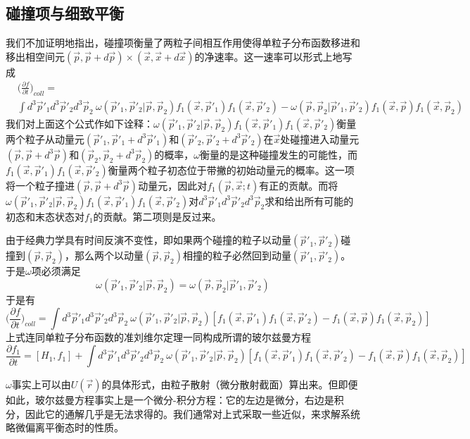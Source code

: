 \documentclass[a4paper,11pt]{ctexart}
\newcommand{\beq}{\begin{equation}}
\newcommand{\eeq}{\end{equation}}
\newcommand{\bea}{\begin{equation}\begin{aligned}}
\newcommand{\eea}{\end{aligned}\end{equation}}
\newcommand{\red}{\color{red}}
\newcommand{\pfrac}[2]{\frac{\partial #1}{\partial #2}}
\begin{document}
\subsection{碰撞项与细致平衡}
我们不加证明地指出，碰撞项衡量了两粒子间相互作用使得单粒子分布函数移进和移出相空间元$(\vec{p},\vec{p} + d\vec{p})\times (\vec{x},\vec{x}+d\vec{x})$的净速率。这一速率可以形式上地写成
\bea
&\bigg(\pfrac{f}{t}\bigg)_{coll} = \\ &\int d^3 \vec{p}'_1 d^3 \vec{p}'_2 d^3 \vec{p}_2 \ \omega(\vec{p}'_1,\vec{p}'_2|\vec{p},\vec{p}_2)f_1(\vec{x},\vec{p}'_1)f_1(\vec{x},\vec{p}'_2) - \omega(\vec{p},\vec{p}_2|\vec{p}'_1,\vec{p}'_2)f_1(\vec{x},\vec{p})f_1(\vec{x},\vec{p}_2)
\eea
我们对上面这个公式作如下诠释：$\omega(\vec{p}'_1,\vec{p}'_2|\vec{p},\vec{p}_2)f_1(\vec{x},\vec{p}'_1)f_1(\vec{x},\vec{p}'_2)$衡量两个粒子从动量元$(\vec{p}'_1,\vec{p}'_1 + d^3\vec{p}'_1)$和$(\vec{p}'_2,\vec{p}'_2 + d^3\vec{p}'_2)$在$\vec{x}$处碰撞进入动量元$(\vec{p},\vec{p} + d^3\vec{p})$和$(\vec{p}_2,\vec{p}_2 + d^3\vec{p}_2)$的概率，$\omega$衡量的是这种碰撞发生的可能性，而$f_1(\vec{x},\vec{p}'_1)f_1(\vec{x},\vec{p}'_2)$衡量两个粒子初态位于带撇的初始动量元的概率。这一项将一个粒子撞进$(\vec{p},\vec{p} + d^3\vec{p})$动量元，因此对$f_1(\vec{p},\vec{x};t)$有正的贡献。而将$\omega(\vec{p}'_1,\vec{p}'_2|\vec{p},\vec{p}_2)f_1(\vec{x},\vec{p}'_1)f_1(\vec{x},\vec{p}'_2)$对$d^3 \vec{p}'_1 d^3 \vec{p}'_2 d^3 \vec{p}_2$求和给出所有可能的初态和末态状态对$f_1$的贡献。第二项则是反过来。
\par
由于经典力学具有时间反演不变性，即如果两个碰撞的粒子以动量$(\vec{p}'_1,\vec{p}'_2)$碰撞到$(\vec{p},\vec{p}_2)$，那么两个以动量$(\vec{p},\vec{p}_2)$相撞的粒子必然回到动量$(\vec{p}'_1,\vec{p}'_2)$。于是$\omega$项必须满足
\beq
\omega(\vec{p}'_1,\vec{p}'_2|\vec{p},\vec{p}_2) = \omega(\vec{p},\vec{p}_2|\vec{p}'_1,\vec{p}'_2)
\eeq
于是有
\beq
\bigg(\pfrac{f}{t}\bigg)_{coll} = \int d^3 \vec{p}'_1 d^3 \vec{p}'_2 d^3 \vec{p}_2\ \omega(\vec{p}'_1,\vec{p}'_2|\vec{p},\vec{p}_2)[f_1(\vec{x},\vec{p}'_1)f_1(\vec{x},\vec{p}'_2) - f_1(\vec{x},\vec{p})f_1(\vec{x},\vec{p}_2)]
\eeq
上式连同单粒子分布函数的准刘维尔定理一同构成所谓的{\red 玻尔兹曼方程}
\beq
\pfrac{f_1}{t} = [H_1,f_1] + \int d^3 \vec{p}'_1 d^3 \vec{p}'_2 d^3 \vec{p}_2\ \omega(\vec{p}'_1,\vec{p}'_2|\vec{p},\vec{p}_2)[f_1(\vec{x},\vec{p}'_1)f_1(\vec{x},\vec{p}'_2) - f_1(\vec{x},\vec{p})f_1(\vec{x},\vec{p}_2)]
\eeq
\par
$\omega$事实上可以由$U(\vec{r})$的具体形式，由粒子散射（微分散射截面）算出来。但即便如此，玻尔兹曼方程事实上是一个微分-积分方程：它的左边是微分，右边是积分，因此它的通解几乎是无法求得的。我们通常对上式采取一些近似，来求解系统略微偏离平衡态时的性质。
\end{document}
